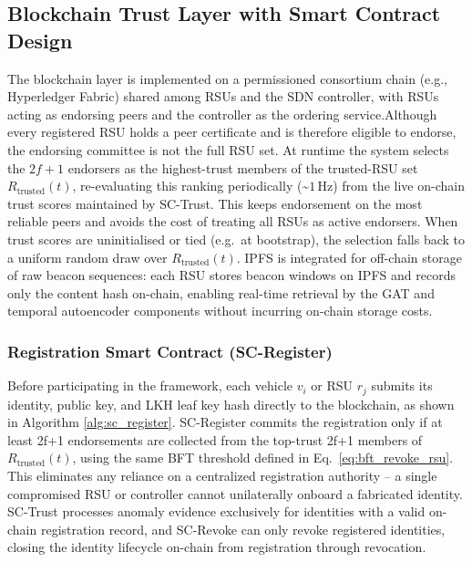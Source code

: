 \documentclass[12pt, a4paper]{report}
\begin{document}
\subsection{Blockchain Trust Layer with Smart Contract Design}
\label{sec:blockchain}

The blockchain layer is implemented on a permissioned consortium
chain (e.g., Hyperledger Fabric) shared among RSUs and the SDN
controller, with RSUs acting as endorsing peers and the controller
as the ordering service.Although every registered RSU holds a peer certificate and is therefore
eligible to endorse, the endorsing committee is not the full RSU
set. At runtime the system selects the $2f+1$ endorsers as the
highest-trust members of the trusted-RSU set $R_{\text{trusted}}(t)$,
re-evaluating this ranking periodically (\textasciitilde$1$\,Hz) from the
live on-chain trust scores maintained by SC-Trust. This keeps endorsement
on the most reliable peers and avoids the cost of treating all RSUs as
active endorsers. When trust scores are uninitialised or tied (e.g.\ at
bootstrap), the selection falls back to a uniform random draw over
$R_{\text{trusted}}(t)$. IPFS is integrated for off-chain storage
of raw beacon sequences: each RSU stores beacon windows on IPFS and
records only the content hash on-chain, enabling real-time retrieval
by the GAT and temporal autoencoder components without incurring
on-chain storage costs.

\subsubsection{Registration Smart Contract (SC-Register)}
Before participating in the framework, each vehicle $v_i$ or RSU $r_j$
submits its identity, public key, and LKH leaf key hash directly to the
blockchain, as shown in Algorithm \ref{alg:sc_register}. SC-Register commits the registration only if at least 2f+1 endorsements are collected from the top-trust 2f+1 members of $R_{\text{trusted}}(t)$, using the same BFT threshold defined in Eq.~\eqref{eq:bft_revoke_rsu}. This eliminates any reliance on a centralized registration authority -- a single compromised RSU or controller cannot unilaterally onboard a fabricated identity. SC-Trust processes anomaly evidence exclusively for identities with a valid
on-chain registration record, and SC-Revoke can only revoke registered
identities, closing the identity lifecycle on-chain from registration
through revocation.
\end{document}
